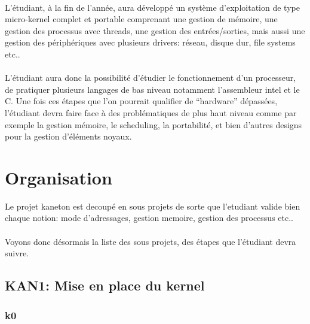 \documentclass[10pt,a4wide]{article}
\begin{document}
\paragraph{}

L'\'etudiant, \`a la fin de l'ann\'ee, aura d\'evelopp\'e un syst\`eme
d'exploitation de type micro-kernel complet et portable comprenant une
gestion de m\'emoire, une gestion des processus avec threads, une gestion
des entr\'ees/sorties, mais aussi une gestion des p\'eriph\'eriques
avec plusieurs drivers: r\'eseau, disque dur, file systems etc..

\paragraph{}

L'\'etudiant aura donc la possibilit\'e d'\'etudier le fonctionnement d'un
processeur, de pratiquer plusieurs langages de bas niveau notamment
l'assembleur intel et le C. Une fois ces \'etapes que l'on pourrait
qualifier de ``hardware'' d\'epass\'ees, l'\'etudiant devra faire face
\`a des probl\'ematiques de plus haut niveau comme par exemple la gestion
m\'emoire, le scheduling, la portabilit\'e, et bien d'autres designs pour la
gestion d'\'el\'ements noyaux.

\newpage

\section{Organisation}

Le projet kaneton est decoup\'e en sous projets de sorte que l'etudiant
valide bien chaque notion: mode d'adressages, gestion memoire, gestion
des processus etc..

\paragraph{}

Voyons donc d\'esormais la liste des sous projets, des \'etapes que
l'\'etudiant devra suivre.

\newpage

\subsection{KAN1: Mise en place du kernel}

\subsubsection{k0}
\end{document}
